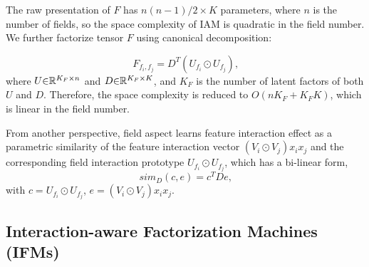 \documentclass[letterpaper]{article} \usepackage{aaai19}  \usepackage{times}  \usepackage{helvet}  \usepackage{courier}  \usepackage{url}  \usepackage{graphicx}  \frenchspacing  \setlength{\pdfpagewidth}{8.5in}  \setlength{\pdfpageheight}{11in}  \usepackage{mathtools}
\begin{document}
The raw presentation of $F$ has $n(n-1)/2 \times K$ parameters, where $n$ is the number of fields, so the space complexity of IAM is quadratic in the field number. We further factorize tensor $F$ using canonical decomposition\cite{kolda2009tensor}:

\begin{equation}
F_{f_i, f_j} = D^T(U_{f_i} \odot U_{f_j}) \text{,}
\label{eq:f}
\end{equation}
where $U\text{\ensuremath{\in}}\mathbb{R}^{ K_F \times n}$ and $D\text{\ensuremath{\in}}\mathbb{R}^{K_F \times K}$, and $K_F$ is the number of latent factors of both $U$ and $D$. Therefore, the space complexity is reduced to $O(nK_F + K_FK)$, which is linear in the field number.


From another perspective, field aspect learns feature interaction effect as a parametric similarity of the feature interaction vector $(V_i\odot V_j)x_ix_j$ and the corresponding field interaction prototype $U_{f_i} \odot U_{f_j}$, which has a bi-linear form\cite{chechik2010large},
\begin{equation}
sim_D(c,e)=c^TDe\text{,}
\end{equation}
with $c=U_{f_i} \odot U_{f_j}$, $e=(V_i\odot V_j)x_ix_j$.

\subsection{Interaction-aware Factorization Machines (IFMs)}
\end{document}
